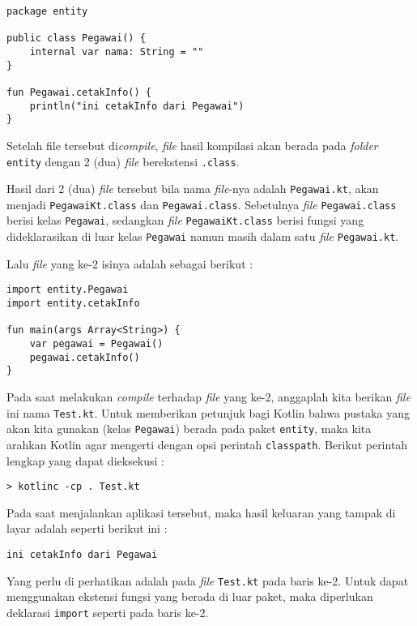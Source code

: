 \begin{lstlisting}
package entity

public class Pegawai() {
	internal var nama: String = ""
}

fun Pegawai.cetakInfo() {
	println("ini cetakInfo dari Pegawai")
}
\end{lstlisting}

Setelah file tersebut di\textit{compile}, \textit{file} hasil kompilasi akan berada pada \textit{folder} \texttt{entity} dengan 2 (dua) \textit{file} berekstensi \texttt{.class}. 

Hasil dari 2 (dua) \textit{file} tersebut bila nama \textit{file}-nya adalah \texttt{Pegawai.kt}, akan menjadi \texttt{PegawaiKt.class} dan \texttt{Pegawai.class}. Sebetulnya \textit{file} \texttt{Pegawai.class} berisi kelas \texttt{Pegawai}, sedangkan \textit{file} \texttt{PegawaiKt.class} berisi fungsi yang dideklarasikan di luar kelas \texttt{Pegawai} namun masih dalam satu \textit{file} \texttt{Pegawai.kt}.

Lalu \textit{file} yang ke-2 isinya adalah sebagai berikut :

\begin{lstlisting}
import entity.Pegawai
import entity.cetakInfo

fun main(args Array<String>) {
	var pegawai = Pegawai()
	pegawai.cetakInfo()
}
\end{lstlisting}

Pada saat melakukan \textit{compile} terhadap \textit{file} yang ke-2, anggaplah kita berikan \textit{file} ini nama \texttt{Test.kt}. Untuk memberikan petunjuk bagi Kotlin bahwa pustaka yang akan kita gunakan (kelas \texttt{Pegawai}) berada pada paket \texttt{entity}, maka kita arahkan Kotlin agar mengerti dengan opsi perintah \texttt{classpath}. Berikut perintah lengkap yang dapat dieksekusi :

\begin{lstlisting}
> kotlinc -cp . Test.kt
\end{lstlisting}

Pada saat menjalankan aplikasi tersebut, maka hasil keluaran yang tampak di layar adalah seperti berikut ini :

\begin{lstlisting}
ini cetakInfo dari Pegawai
\end{lstlisting}

Yang perlu di perhatikan adalah pada \textit{file} \texttt{Test.kt} pada baris ke-2. Untuk dapat menggunakan ekstensi fungsi yang berada di luar paket, maka diperlukan deklarasi \texttt{import} seperti pada baris ke-2. 

